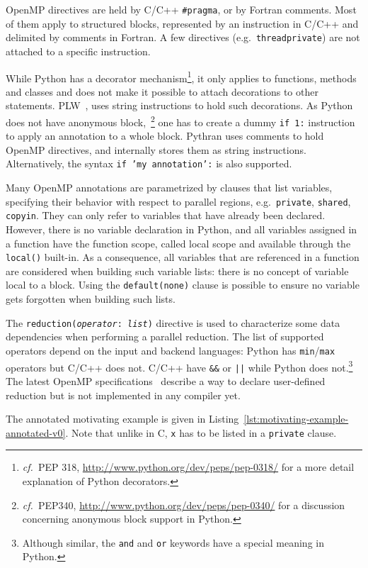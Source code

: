 \documentclass[conference]{IEEEtran}
\newcommand\see{\emph{cf.\ }}
\begin{document}
OpenMP directives are held by C/C++ \texttt{\#pragma}, or by Fortran comments. Most of them
apply to structured blocks, represented by an instruction in C/C++ and delimited
by comments in Fortran. A few directives (e.g.\ \texttt{threadprivate}) are not
attached to a specific instruction.

While Python has a decorator mechanism\footnote{\see PEP 318,
\url{http://www.python.org/dev/peps/pep-0318/} for a more detail explanation of
Python decorators.}, it only applies to functions, methods and classes and does
not make it possible to attach decorations to other statements.
PLW~\cite{dongara2007}, uses string instructions to hold such decorations. As
Python does not have anonymous block,~\footnote{\see PEP340,
    \url{http://www.python.org/dev/peps/pep-0340/} for a discussion concerning
anonymous block support in Python.} one has to create a dummy \texttt{if 1:}
instruction to apply an annotation to a whole block. Pythran uses comments to
hold OpenMP directives, and internally stores them as string instructions.
Alternatively, the syntax \texttt{if 'my annotation':} is also supported. 

Many OpenMP annotations are parametrized by clauses that list variables,
specifying their behavior with respect to parallel regions, e.g.\
\texttt{private}, \texttt{shared}, \texttt{copyin}. They can only refer to
variables that have already been declared. However, there is no variable
declaration in Python, and all variables assigned in a function have the
function scope, called local scope and available through the \texttt{local()}
built-in. As a consequence, all variables that are referenced in a function are
considered when building such variable lists: there is no concept of variable
local to a block. Using the \texttt{default(none)} clause is possible to ensure
no variable gets forgotten when building such lists.

The \texttt{reduction(\emph{operator}: \emph{list})} directive is used to
characterize some data dependencies when performing a parallel reduction. The
list of supported operators depend on the input and backend languages: Python
has \texttt{min}/\texttt{max} operators but C/C++ does not. C/C++ have
\texttt{\&\&} or \texttt{||} while Python does not.\footnote{Although similar,
the \texttt{and} and \texttt{or} keywords have a special meaning in Python.} The
latest OpenMP specifications~\cite{openmp4} describe a way to declare
user-defined reduction but is not implemented in any compiler yet.

The annotated motivating example is given in
Listing~\ref{lst:motivating-example-annotated-v0}. Note that unlike in C,
\texttt{x} has to be listed in a \texttt{private} clause.
\end{document}
